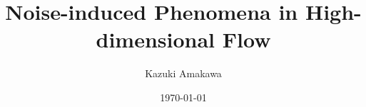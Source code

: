 \documentclass[notheorems, UTF8]{beamer}
\title[High-dim SDE]{Noise-induced Phenomena in High-dimensional Flow}
\author{Kazuki Amakawa}
\institute[HU]
{
Hokkaidou University, Department of Mathematics
}
\date{\today}
\begin{document}
\begin{frame}
\titlepage
\end{frame}



\end{document}
